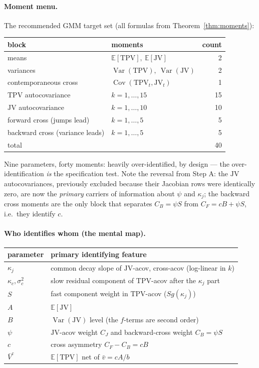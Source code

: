 \documentclass[11pt]{report}
\theoremstyle{definition}
\theoremstyle{remark}
\newcommand{\E}{\mathbb{E}}
\newcommand{\Var}{\operatorname{Var}}
\newcommand{\Cov}{\operatorname{Cov}}
\newcommand{\TPV}{\mathrm{TPV}}
\newcommand{\JV}{\mathrm{JV}}
\begin{document}
\paragraph{Moment menu.} The recommended GMM target set (all formulas from
Theorem~\ref{thm:moments}):
\begin{center}
\begin{tabular}{llr}
\toprule
block & moments & count\\
\midrule
means & $\E[\TPV],\ \E[\JV]$ & 2\\
variances & $\Var(\TPV),\ \Var(\JV)$ & 2\\
contemporaneous cross & $\Cov(\TPV_t,\JV_t)$ & 1\\
$\TPV$ autocovariance & $k=1,\dots,15$ & 15\\
$\JV$ autocovariance & $k=1,\dots,10$ & 10\\
forward cross (jumps lead) & $k=1,\dots,5$ & 5\\
backward cross (variance leads) & $k=1,\dots,5$ & 5\\
\midrule
total & & 40\\
\bottomrule
\end{tabular}
\end{center}
Nine parameters, forty moments: heavily over-identified, by design --- the
over-identification \emph{is} the specification test. Note the reversal from
Step A: the $\JV$ autocovariances, previously excluded because their
Jacobian rows were identically zero, are now the \emph{primary} carriers of
information about $\psi$ and $\kappa_{j}$; the backward cross moments are
the only block that separates $C_{B}=\psi S$ from $C_{F}=cB+\psi S$, i.e.\
they identify $c$.

\paragraph{Who identifies whom (the mental map).}
\begin{center}
\begin{tabular}{ll}
\toprule
parameter & primary identifying feature\\
\midrule
$\kappa_{j}$ & common decay slope of $\JV$-acov, cross-acov (log-linear in $k$)\\
$\kappa_{c},\sigma_{c}^{2}$ & slow residual component of $\TPV$-acov after the $\kappa_{j}$ part\\
$S$ & fast component weight in $\TPV$-acov ($S g(\kappa_{j})$)\\
$A$ & $\E[\JV]$\\
$B$ & $\Var(\JV)$ level (the $f$-terms are second order)\\
$\psi$ & $\JV$-acov weight $C_{J}$ and backward-cross weight $C_{B}=\psi S$\\
$c$ & cross asymmetry $C_{F}-C_{B}=cB$\\
$\bar V^{c}$ & $\E[\TPV]$ net of $\bar v=cA/b$\\
\bottomrule
\end{tabular}
\end{center}
\end{document}
